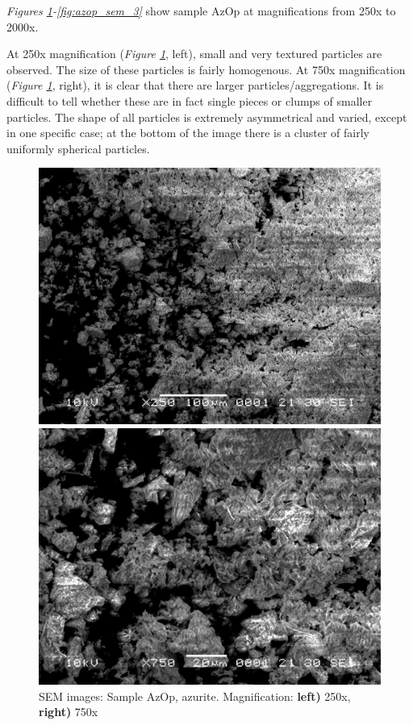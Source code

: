 \textit{Figures \ref{fig:azop_sem_1}-\ref{fig:azop_sem_3}} show sample AzOp at magnifications from 250x to 2000x. 

At 250x magnification (\textit{Figure \ref{fig:azop_sem_1}}, left), small and very textured particles are observed. The size of these particles is fairly homogenous. At 750x magnification (\textit{Figure \ref{fig:azop_sem_1}}, right), it is clear that there are larger particles/aggregations. It is difficult to tell whether these are in fact single pieces or clumps of smaller particles. The shape of all particles is extremely asymmetrical and varied, except in one specific case; at the bottom of the image there is a cluster of fairly uniformly spherical particles. 

\begin{figure}[H]
\centering
\begin{minipage}{.45\textwidth}
  \centering
  \includegraphics[width=\linewidth]{AzOp_x250_1_150321}
\end{minipage}
\begin{minipage}{.45\textwidth}
  \centering
  \includegraphics[width=\linewidth]{AzOp_x750_2_150321}
\end{minipage}
\caption[SEM images: Sample AzOp, azurite]{SEM images: Sample AzOp, azurite. Magnification: \textbf{left)} 250x, \textbf{right)} 750x}
\label{fig:azop_sem_1}
\end{figure}


